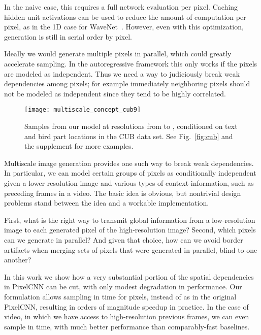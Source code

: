 \documentclass{article}
\begin{document}
In the naive case, this requires a full network evaluation per pixel.
Caching hidden unit activations can be used to reduce the amount of computation per pixel, as in the 1D case for WaveNet~\cite{oord2016wavenet,ramachandran2017fastgeneration}.
However, even with this optimization, generation is still in serial order by pixel.


Ideally we would generate multiple pixels in parallel, which could greatly accelerate sampling.
In the autoregressive framework this only works if the pixels are modeled as independent.
Thus we need a way to judiciously break weak dependencies among pixels; for example immediately neighboring pixels should not be modeled as independent since they tend to be highly correlated.







\begin{figure}[t!]
\texttt{[image: multiscale\_concept\_cub9]}\vspace{-0.15in}
\caption{Samples from our model at resolutions from  to , conditioned on text and bird part locations in the CUB data set. See Fig.~\ref{fig:cub} and the supplement for more examples.}
\label{fig:concept}
\vspace{-0.1in}
\end{figure}

Multiscale image generation provides one such way to break weak dependencies.
In particular, we can model certain groups of pixels as conditionally independent given a lower resolution image and various types of context information, such as preceding frames in a video.
The basic idea is obvious, but nontrivial design problems stand between the idea and a workable implementation.

First, what is the right way to transmit global information from a low-resolution image to each generated pixel of the high-resolution image?
Second, which pixels can we generate in parallel? And given that choice, how can we avoid border artifacts when merging sets of pixels that were generated in parallel, blind to one another?

In this work we show how a very substantial portion of the spatial dependencies in PixelCNN can be cut, with only modest degradation in performance.
Our formulation allows sampling in  time for  pixels, instead of  as in the original PixelCNN, resulting in orders of magnitude speedup in practice. In the case of video, in which we have access to high-resolution previous frames, we can even sample in  time, with much better performance than comparably-fast baselines.
\end{document}
